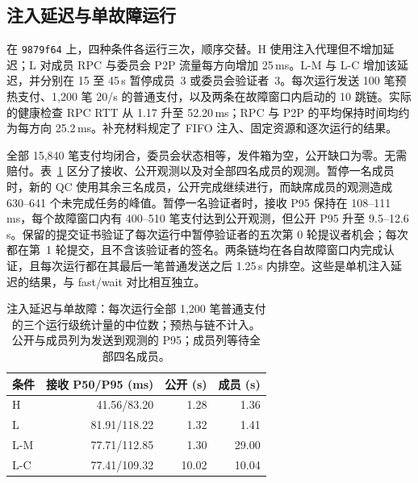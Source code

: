 \subsection{注入延迟与单故障运行}
\label{sec:eval-faults}
在 \texttt{9879f64} 上，四种条件各运行三次，顺序交替。H 使用注入代理但不增加延迟；L 对成员 RPC 与委员会 P2P 流量每方向增加 25\,ms。L-M 与 L-C 增加该延迟，并分别在 15 至 45\,s 暂停成员~3 或委员会验证者~3。每次运行发送 100 笔预热支付、1,200 笔 20/s 的普通支付，以及两条在故障窗口内启动的 10 跳链。实际的健康检查 RPC RTT 从 1.17 升至 52.20\,ms；RPC 与 P2P 的平均保持时间均约为每方向 25.2\,ms。补充材料规定了 FIFO 注入、固定资源和逐次运行的结果。

全部 15,840 笔支付均闭合，委员会状态相等，发件箱为空，公开缺口为零。无需赔付。表~\ref{tab:eval-faults} 区分了接收、公开观测以及对全部四名成员的观测。暂停一名成员时，新的 QC 使用其余三名成员，公开完成继续进行，而缺席成员的观测造成 630--641 个未完成任务的峰值。暂停一名验证者时，接收 P95 保持在 108--111\,ms，每个故障窗口内有 400--510 笔支付达到公开观测，但公开 P95 升至 9.5--12.6\,s。保留的提交证书验证了每次运行中暂停验证者的五次第 0 轮提议者机会；每次都在第~1 轮提交，且不含该验证者的签名。两条链均在各自故障窗口内完成认证，且每次运行都在其最后一笔普通发送之后 1.25\,s 内排空。这些是单机注入延迟的结果，与 fast/wait 对比相互独立。

\begin{table}[t]
\caption{注入延迟与单故障：每次运行全部 1,200 笔普通支付的三个运行级统计量的中位数；预热与链不计入。公开与成员列为发送到观测的 P95；成员列等待全部四名成员。}
\label{tab:eval-faults}
\centering\small
\begin{tabular}{@{}lrrr@{}}
\toprule
条件 & 接收 P50/P95 (ms) & 公开 (s) & 成员 (s)\\
\midrule
H   & 41.56/83.20  & 1.28 & 1.36\\
L   & 81.91/118.22 & 1.32 & 1.41\\
L-M & 77.71/112.85 & 1.30 & 29.00\\
L-C & 77.41/109.32 & 10.02 & 10.04\\
\bottomrule
\end{tabular}
\end{table}
